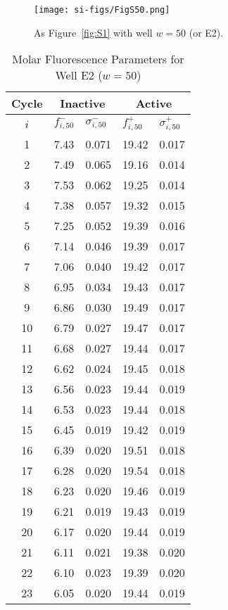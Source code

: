                \begin{figure}
                    \centering
                    \texttt{[image: si-figs/FigS50.png]}
                    \caption{
                        As Figure~\ref{fig:S1} with well $w=50$ (or E2).
                    }
                \end{figure}
                \clearpage
    \begin{table}
        \caption{Molar Fluorescence Parameters for Well E2 ($w=50$)}
        \centering
        \begin{tabular}{c|ll|ll}
            Cycle & \multicolumn{2}{c|}{Inactive} & \multicolumn{2}{c}{Active} \\
            \hline
            $i$ & $f_{i,50}^{-}$ & $\sigma_{i,50}^{-}$ &  $f_{i,50}^{+}$ & $\sigma_{i,50}^{+}$ \\
            \hline
    1 & 7.43 & 0.071 & 19.42 & 0.017 \\
2 & 7.49 & 0.065 & 19.16 & 0.014 \\
3 & 7.53 & 0.062 & 19.25 & 0.014 \\
4 & 7.38 & 0.057 & 19.32 & 0.015 \\
5 & 7.25 & 0.052 & 19.39 & 0.016 \\
6 & 7.14 & 0.046 & 19.39 & 0.017 \\
7 & 7.06 & 0.040 & 19.42 & 0.017 \\
8 & 6.95 & 0.034 & 19.43 & 0.017 \\
9 & 6.86 & 0.030 & 19.49 & 0.017 \\
10 & 6.79 & 0.027 & 19.47 & 0.017 \\
11 & 6.68 & 0.027 & 19.44 & 0.017 \\
12 & 6.62 & 0.024 & 19.45 & 0.018 \\
13 & 6.56 & 0.023 & 19.44 & 0.019 \\
14 & 6.53 & 0.023 & 19.44 & 0.018 \\
15 & 6.45 & 0.019 & 19.42 & 0.019 \\
16 & 6.39 & 0.020 & 19.51 & 0.018 \\
17 & 6.28 & 0.020 & 19.54 & 0.018 \\
18 & 6.23 & 0.020 & 19.46 & 0.019 \\
19 & 6.21 & 0.019 & 19.43 & 0.019 \\
20 & 6.17 & 0.020 & 19.44 & 0.019 \\
21 & 6.11 & 0.021 & 19.38 & 0.020 \\
22 & 6.10 & 0.023 & 19.39 & 0.020 \\
23 & 6.05 & 0.020 & 19.44 & 0.019 \\

\end{tabular}
\end{table}
